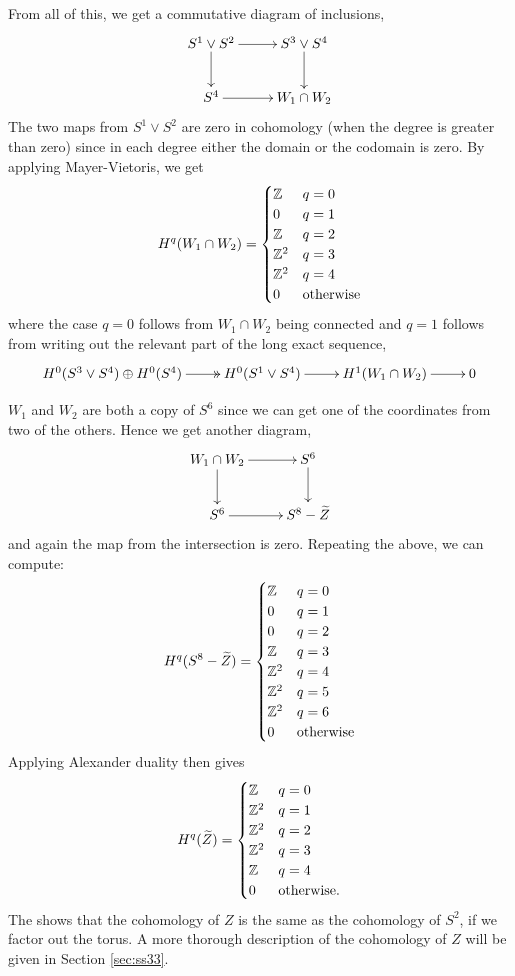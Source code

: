 \begin{example}
  From all of this, we get a commutative diagram of inclusions,
  \[ \xymatrix{
    S^1\vee S^2 \ar[r]\ar[d] & S^3\vee S^4 \ar[d] \\
    S^4 \ar[r] & W_1\cap W_2
  } \]
  The two maps from $S^1\vee S^2$ are zero in cohomology (when the
  degree is greater than zero) since in each
  degree either the domain or the codomain is zero. By applying
  Mayer-Vietoris, we get
  \[ H^q(W_1\cap W_2) =
  \begin{cases}
    \mathbb{Z} & q=0 \\
    0 & q = 1 \\
    \mathbb{Z} & q = 2 \\
    \mathbb{Z}^2 & q = 3 \\
    \mathbb{Z}^2 & q =4 \\
    0 & \text{otherwise}
  \end{cases} \]
  where the case $q=0$ follows from $W_1\cap W_2$ being connected
  and $q = 1$ follows from writing out the relevant part of the
  long exact sequence,
  \[ \xymatrix{ H^0(S^3\vee S^4)\oplus H^0(S^4) \ar@{->>}[r] &
    H^0(S^1\vee S^4) \ar[r] & H^1(W_1\cap W_2) \ar[r] & 0} \]
  
  $W_1$ and $W_2$ are both a copy of $S^6$ since we can get one of
  the coordinates from two of the others. Hence we get another diagram,
  \[ \xymatrix{
    W_1\cap W_2 \ar[r]\ar[d] & S^6 \ar[d] \\
    S^6 \ar[r] & S^8-\widetilde Z
  } \]
  and again the map from the intersection is zero. Repeating the
  above, we can compute:
  \[ H^q(S^8-\widetilde Z) =
  \begin{cases}
    \mathbb{Z} & q = 0 \\
    0 & q = 1 \\
    0 & q = 2 \\
    \mathbb{Z} & q = 3 \\
    \mathbb{Z}^2 & q = 4 \\
    \mathbb{Z}^2 & q = 5 \\
    \mathbb{Z}^2 & q =6 \\
    0 & \text{otherwise}
  \end{cases} \]
  Applying Alexander duality then gives
  \[ H^q(\widetilde Z) =
  \begin{cases}
    \mathbb{Z} & q = 0 \\
    \mathbb{Z}^2 & q = 1 \\
    \mathbb{Z}^2 & q = 2 \\
    \mathbb{Z}^2 & q = 3 \\
    \mathbb{Z} & q = 4 \\
    0 & \text{otherwise}.
  \end{cases} \]
  The shows that the cohomology of $Z$ is the same as the
  cohomology of $S^2$, if we factor out the torus. A more
  thorough description of the cohomology of $Z$ will be given in
  Section \ref{sec:ss33}.


\end{example}
